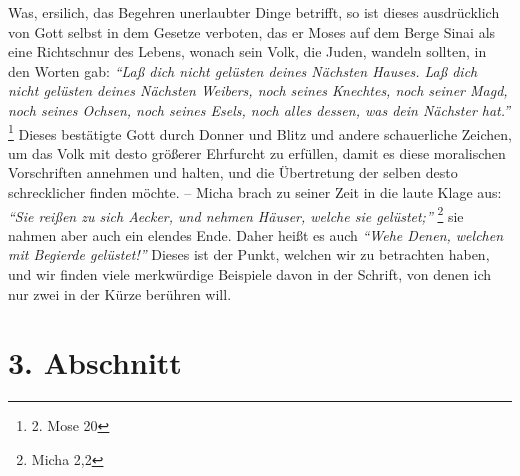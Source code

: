 Was, ersilich, das Begehren unerlaubter Dinge betrifft, so ist dieses
ausdrücklich von Gott selbst in dem Gesetze verboten,
das er Moses auf dem
Berge Sinai als eine Richtschnur des Lebens, wonach
sein Volk, die Juden,
wandeln sollten, in den Worten gab:
\textit{"`Laß dich nicht gelüsten deines Nächsten
Hauses. Laß dich nicht gelüsten deines Nächsten Weibers, noch seines Knechtes,
noch seiner Magd, noch seines Ochsen, noch seines Esels, noch alles dessen, was
dein Nächster hat."'}
\footnote{2. Mose 20}
Dieses bestätigte Gott durch Donner und
Blitz und andere schauerliche Zeichen, um das Volk
mit desto größerer Ehrfurcht
zu erfüllen, damit es diese moralischen Vorschriften annehmen und halten, und
die Übertretung der selben desto schrecklicher finden möchte. --
Micha brach zu
seiner Zeit in die laute Klage aus:
\textit{"`Sie reißen zu sich Aecker, und nehmen
Häuser, welche sie gelüstet;"'}
\footnote{Micha 2,2}
sie nahmen aber auch ein
elendes Ende. Daher heißt es auch
\textit{"`Wehe Denen, welchen mit Begierde gelüstet!"'}
Dieses ist der Punkt, welchen wir zu betrachten haben, und wir finden viele
merkwürdige Beispiele davon in der Schrift, von denen ich nur zwei in der Kürze
berühren will.

\section{3. Abschnitt} \label{kap13_ab3}

